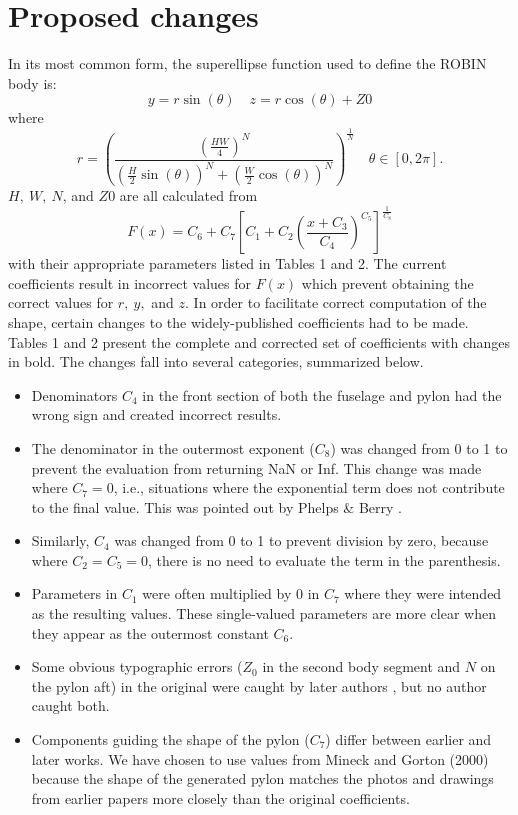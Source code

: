 \documentclass{ahs}
\begin{document}
\section{Proposed changes}
 In its most common form, the superellipse function used to define the ROBIN body is:
\begin{equation}
   y=r\sin(\theta) \quad z=r\cos(\theta)+Z0
\end{equation} 
where \begin{equation}
  r=\left(\frac{(\frac{HW}{4})^{N}}{\left(\frac{H}{2}\sin(\theta)\right)^{N}+\left(\frac{W}{2}\cos(\theta)\right)^{N}}\right)^{\frac{1}{N}} \quad \theta\in[0,2\pi].
\end{equation}
$H, \ W, \ N$, and $Z0$ are all calculated from
\begin{equation}
  F(x) = C_{6}+C_{7}\left[C_{1}+C_{2}\left(\frac{x+C_{3}}{C_{4}}\right)^{C_{5}}\right]^{\frac{1}{C_{8}}}
\end{equation}
with their appropriate parameters listed in Tables 1 and 2. The current coefficients result in incorrect values for $F(x)$ which prevent obtaining the correct values for $r, \ y,$ and $z$. In order to facilitate correct computation of the shape, certain changes to the
widely-published coefficients had to be made.
Tables 1 and 2 present the complete and corrected set of coefficients with changes in bold.
The changes fall into several categories, summarized below.
\begin{itemize}
\item Denominators $C_{4}$ in the front section of both the fuselage and pylon had the wrong sign
and created incorrect results.
\item The denominator in the outermost exponent ($C_{8}$) was changed from 0 to 1 to prevent the evaluation from returning NaN or Inf.
This change was made where $C_{7}=0$, i.e., situations where the exponential term does not contribute to the final value.
This was pointed out by Phelps \& Berry \cite{nasa87762}.
\item Similarly, $C_{4}$ was changed from 0 to 1 to prevent division by zero, because
where $C_{2}=C_{5}=0$, there is no need to evaluate the term in the parenthesis.
\item Parameters in $C_{1}$ were often multiplied by 0 in $C_{7}$ where they were intended as the resulting values.
These single-valued parameters are more clear when they appear as the outermost constant $C_{6}$.
\item Some obvious typographic errors ($Z_0$ in the second body segment and $N$ on the pylon aft)
in the original \cite{nasa80051} were caught by later authors \cite{nasa87762,mineckgorton}, but no author caught both.
\item Components guiding the shape of the pylon ($C_{7}$) differ between earlier and later works.
We have chosen to use values from Mineck and Gorton (2000) \cite{mineckgorton} because the shape of the generated 
pylon matches the photos and drawings from earlier papers more closely \cite{nasa80051,nasa87762} than the original coefficients.
\end{itemize}
\end{document}
